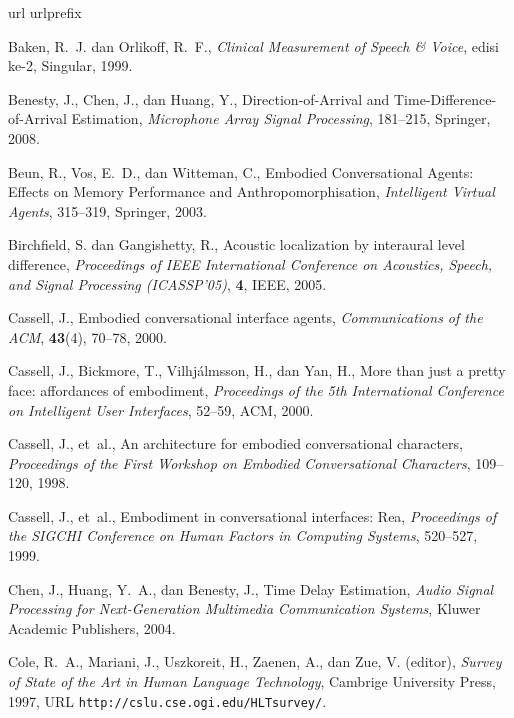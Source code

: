 \begin{thebibliography}{10}
\def\enquote#1{``#1''}
\expandafter\ifx\csname url\endcsname\relax
  \def\url#1{{\tt #1}}\fi
\expandafter\ifx\csname urlprefix\endcsname\relax\def\urlprefix{URL }\fi

Baken, R.~J. dan Orlikoff, R.~F.,
  {\em {Clinical Measurement of Speech \& Voice}\/},
  edisi ke-2, Singular, 1999.

Benesty, J., Chen, J., dan Huang, Y.,
  {Direction-of-Arrival and Time-Difference-of-Arrival Estimation},
  {\em {Microphone Array Signal Processing}\/},
  181--215, Springer, 2008.

Beun, R., Vos, E.~D., dan Witteman, C.,
  {Embodied Conversational Agents: Effects on Memory Performance and Anthropomorphisation},
  {\em Intelligent Virtual Agents\/}, 
  315--319, Springer, 2003.

Birchfield, S. dan Gangishetty, R.,
  {Acoustic localization by interaural level difference},
  {\em Proceedings of IEEE International Conference
  on Acoustics, Speech, and Signal Processing (ICASSP'05)\/},
  \textbf{4}, IEEE, 2005.

Cassell, J.,
  {Embodied conversational interface agents},
  {\em Communications of the ACM\/}, \textbf{43}(4),
  70--78, 2000.

Cassell, J., Bickmore, T., Vilhj{\'a}lmsson, H., dan Yan, H.,
  {More than just a pretty face: affordances of embodiment},
  {\em Proceedings of the 5th International Conference on Intelligent User Interfaces\/},
  52--59, ACM, 2000.

Cassell, J., et~al.,
  {An architecture for embodied conversational characters},
  {\em Proceedings of the First Workshop on Embodied Conversational Characters\/},
  109--120, 1998.

Cassell, J., et~al.,
  {Embodiment in conversational interfaces: Rea},
  {\em Proceedings of the SIGCHI Conference on Human Factors in Computing Systems\/},
  520--527, 1999.

Chen, J., Huang, Y.~A., dan Benesty, J.,
  {Time Delay Estimation},
  {\em {Audio Signal Processing for Next-Generation Multimedia Communication Systems}\/},
  Kluwer Academic Publishers, 2004.

Cole, R.~A., Mariani, J., Uszkoreit, H., Zaenen, A., dan Zue, V. (editor),
  {\em {Survey of State of the Art in Human Language Technology}\/},
  Cambrige University Press, 1997, \urlprefix\url{http://cslu.cse.ogi.edu/HLTsurvey/}.


\end{thebibliography}
